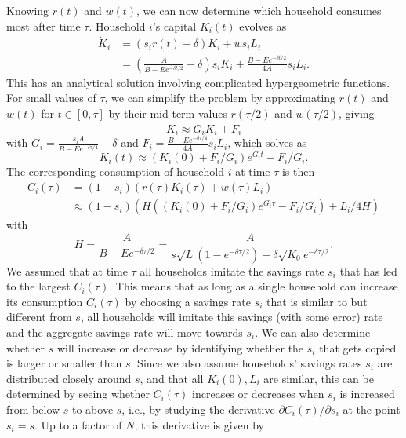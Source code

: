 Knowing $r(t)$ and $w(t)$, we can now determine which household consumes most after time $\tau$.
Household $i$'s capital $K_i(t)$ evolves as 
\begin{equation}
\begin{split}
    \dot K_i 
    &= (s_i r(t) - \delta) K_i + w s_i L_i \nonumber \\
    &= \left(\frac{A}{B - E e^{-\delta t/2}} - \delta\right)s_i K_i
        + \frac{B - E e^{-\delta t/2}}{4 A} s_i L_i.
\end{split}
\end{equation}
This has an analytical solution involving complicated hypergeometric functions.
For small values of $\tau$, we can simplify the problem by approximating $r(t)$ and $w(t)$ for $t\in[0,\tau]$ by their mid-term values $r(\tau/2)$ and $w(\tau/2)$, giving
\begin{equation*}
\dot{K_i} \approx G_i K_i + F_i
\end{equation*}
with $G_i = \frac{s_i A}{B - E e^{-\delta \tau/4}} - \delta$
and $F_i = \frac{B - E e^{-\delta \tau/4}}{4 A} s_i L_i$,
which solves as
\begin{equation*}
    K_i(t) \approx (K_i(0) + F_i/G_i)e^{G_i t} - F_i/G_i.
\end{equation*}
The corresponding consumption of household $i$ at time $\tau$ is then
\begin{align}
    C_i(\tau) 
    &= (1 - s_i)(r(\tau) K_i(\tau) + w(\tau) L_i) \nonumber \\
    &\approx (1 - s_i)\left( 
        H((K_i(0) + F_i/G_i)e^{G_i\tau} - F_i/G_i)
        + L_i/4 H
    \right)
\label{eq:Citau}
\end{align}
with 
\begin{equation}
        H = \frac{A}{B - E e^{-\delta\tau/2}} = \frac{A}{s\sqrt L (1 - e^{-\delta\tau/2}) + \delta \sqrt{K_0} e^{-\delta\tau/2}}.\nonumber
\end{equation}
We assumed that at time $\tau$ all households imitate the savings rate $s_i$ that has led to the largest $C_i(\tau)$. This means that as long as a single household can increase its consumption $C_i(\tau)$ by choosing a savings rate $s_i$ that is similar to but different from $s$, all households will imitate this savings (with some error) rate and the aggregate savings rate will move towards $s_i$. 
We can also determine whether $s$ will increase or decrease by identifying whether the $s_i$ that gets copied is larger or smaller than $s$.
Since we also assume households' savings rates $s_i$ are distributed closely around $s$, and that all $K_i(0), L_i$ are similar, this can be determined by seeing whether $C_i(\tau)$ increases or decreases when $s_i$ is increased from below $s$ to above $s$, i.e., by studying the derivative $\partial C_i(\tau)/\partial s_i$ at the point $s_i = s$. Up to a factor of $N$, this derivative is given by
